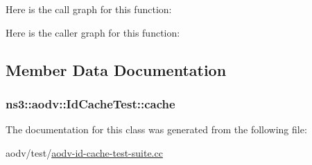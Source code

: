 Here is the call graph for this function\+:




Here is the caller graph for this function\+:




\subsection{Member Data Documentation}
\subsubsection[{\texorpdfstring{cache}{cache}}]{ ns3\+::aodv\+::\+Id\+Cache\+Test\+::cache\hspace{0.3cm}{\ttfamily [private]}}\hypertarget{classns3_1_1aodv_1_1IdCacheTest_a6cccec1766c0093ff16c3abd92f1579c}{}\label{classns3_1_1aodv_1_1IdCacheTest_a6cccec1766c0093ff16c3abd92f1579c}


The documentation for this class was generated from the following file\+:\begin{DoxyCompactItemize}
\item 
aodv/test/\hyperlink{aodv-id-cache-test-suite_8cc}{aodv-\/id-\/cache-\/test-\/suite.\+cc}\end{DoxyCompactItemize}
